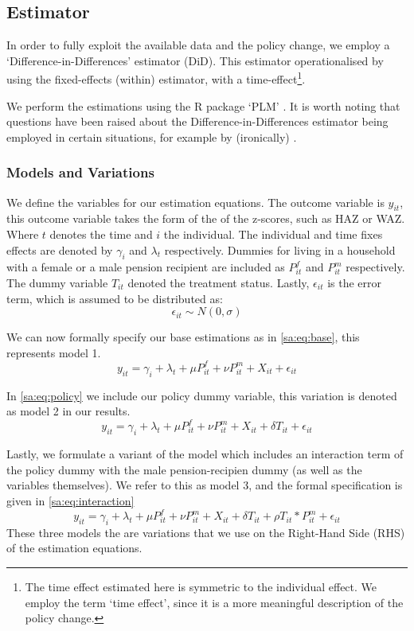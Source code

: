 \begin{refsection}
\subsection{Estimator}
In order to fully exploit the available data and the policy change,
we employ a `Difference-in-Differences' estimator (DiD).
This estimator operationalised by using the fixed-effects (within) estimator, with a time-effect\footnote{The time effect estimated here is symmetric to the individual effect.
We employ the term `time effect', since it is a more meaningful description of the policy change.}.

We perform the estimations using the R package `PLM' \parencite[see][]{croissant2008panel}.
It is worth noting  that questions have been raised about the Difference-in-Differences estimator being employed in certain situations,
for example by (ironically) \textcite{bertrand2004much}.

\subsubsection{Models and Variations}
We define the variables for our estimation equations.
The outcome variable is $y_{it}$, this outcome variable takes the form of the of the z-scores,
such as HAZ or WAZ.
Where $t$ denotes the time and $i$ the individual.
The individual and time fixes effects are denoted by $\gamma_i$ and $\lambda_t$ respectively.
Dummies for living in a household with a female or a male pension recipient are included as $P^f_{it}$ and $P^m_{it}$ respectively.
The dummy variable $T_{it}$ denoted the treatment status.
Lastly, $\epsilon_{it}$ is the error term, which is assumed to be distributed as:
\[
\epsilon_{it} \sim N(0,\sigma)
\]

We can now formally specify our base estimations as in \autoref{sa:eq:base}, this represents model 1.
\begin{equation}
\label{sa:eq:base}
y_{it} = \gamma_i + \lambda_t + \mu P^f_{it} + \nu P^m_{it} + X_{it} + \epsilon_{it}
\end{equation}

In \autoref{sa:eq:policy} we include our policy dummy variable, this variation is denoted as model 2 in our results.
\begin{equation}
\label{sa:eq:policy}
y_{it} = \gamma_i + \lambda_t + \mu P^f_{it} + \nu P^m_{it} + X_{it} + \delta T_{it} + \epsilon_{it}
\end{equation}

Lastly, we formulate a variant of the model which includes an interaction term of the policy dummy with the male pension-recipien dummy
(as well as the variables themselves).
We refer to this as model 3, and the formal specification is given in \autoref{sa:eq:interaction}
\begin{equation}
\label{sa:eq:interaction}
y_{it} = \gamma_i + \lambda_t + \mu P^f_{it} + \nu P^m_{it} + X_{it} + \delta T_{it} + \rho T_{it}*P^m_{it} + \epsilon_{it}
\end{equation}
These three models the are variations that we use on the Right-Hand Side (RHS) of the estimation equations.


\end{refsection}
